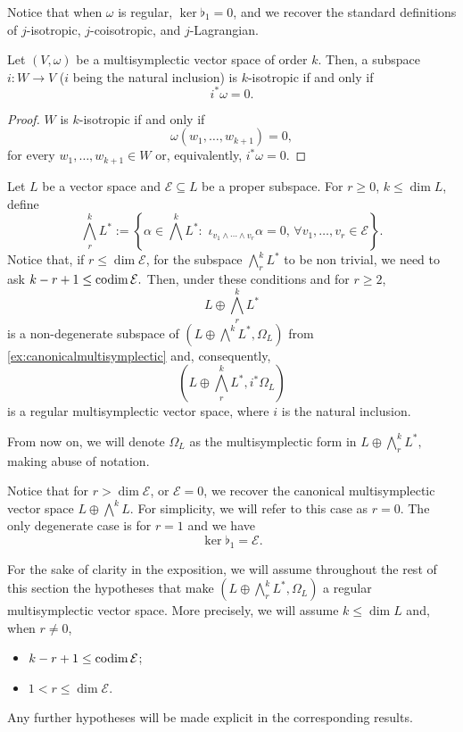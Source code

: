 \begin{obs} Notice that when $\omega$ is regular, $\ker \flat_1 = 0$, and we recover the standard definitions of $j$-isotropic, $j$-coisotropic, and $j$-Lagrangian.
\end{obs}
\begin{proposition}\label{prop:characterizationisotropic} Let $(V, \omega)$ be a multisymplectic vector space of order $k$. Then, a subspace $i: W \rightarrow V$ ($i$ being the natural inclusion) is $k$-isotropic if and only if $$i^\ast \omega = 0.$$
\end{proposition}
\begin{proof}$W$ is $k$-isotropic if and only if $$\omega(w_1, \dots, w_{k+1}) = 0,$$ for every $w_1, \dots, w_{k+1} \in W$ or, equivalently, $i^\ast \omega = 0.$
\end{proof}
 \begin{example}\label{ex:verticalforms} Let $L$ be a vector space and $\mathcal{E} \subseteq L$ be a proper subspace. For $r \geq 0$, $k \leq \dim L$, define $$\bigwedge^k_r L^\ast := \left\{\alpha \in \bigwedge^k L^\ast : \,\, \iota_{v_1 \wedge \cdots \wedge v_r} \alpha = 0,\, \forall v_1, \dots, v_r \in \mathcal{E}\right\}.$$Notice that, if $r \leq \dim \mathcal{E}$, for the subspace $\bigwedge^k_r L^\ast$ to be non trivial, we need to ask $k - r + 1 \leq \operatorname{codim} \mathcal{E}.$ Then, under these conditions and for $r \geq 2$, $$L \oplus \bigwedge^k_r L^\ast$$ is a non-degenerate subspace of $(L \oplus \bigwedge^k L^\ast, \Omega_L)$ from \cref{ex:canonicalmultisymplectic} and, consequently, $$\left(L \oplus \bigwedge^k_r L^\ast, i^\ast\Omega_L\right)$$ is a regular multisymplectic vector space, where $i$ is the natural inclusion. 
\end{example}

From now on, we will denote $\Omega_L$ as the multisymplectic form in $L \oplus \bigwedge ^k_r L^\ast,$ making abuse of notation.

\begin{obs} Notice that for $r > \dim \mathcal{E}$, or $\mathcal{E} = 0$, we recover the canonical multisymplectic vector space $L \oplus \bigwedge^k L$. For simplicity, we will refer to this case as $r = 0$. The only degenerate case is for $r = 1$ and we have $$\ker \flat_1 = \mathcal{E}.$$
\end{obs}

\begin{remark}\label{hypotheseskr}For the sake of clarity in the exposition, we will assume throughout the rest of this section the hypotheses that make $(L\oplus \bigwedge^k_r L^\ast, \Omega_L)$ a regular multisymplectic vector space. More precisely, we will assume $k \leq \dim L$ and, when $r \neq 0$,
\begin{itemize}
    \item $k - r +1 \leq \operatorname{codim} \mathcal{E}$;
    \item $1 < r \leq \dim \mathcal{E}$.
\end{itemize}
Any further hypotheses will be made explicit in the corresponding results.
\end{remark}

